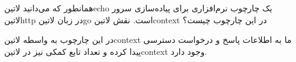 
همانطور که می‌دانید ‌لاتین{echo} یک چارچوب نرم‌افزاری برای پیاده‌سازی سرور ‌لاتین{http} در زبان ‌لاتین{go} است.
نقش ‌لاتین{context} در این چارچوب چیست؟


\begin{پاسخ}

در این چارچوب به واسطه ‌لاتین{context} ما به اطلاعات پاسخ و درخواست دسترسی پیدا کرده و تعداد تابع کمکی نیز در ‌لاتین{context} وجود دارد.

\end{پاسخ}
